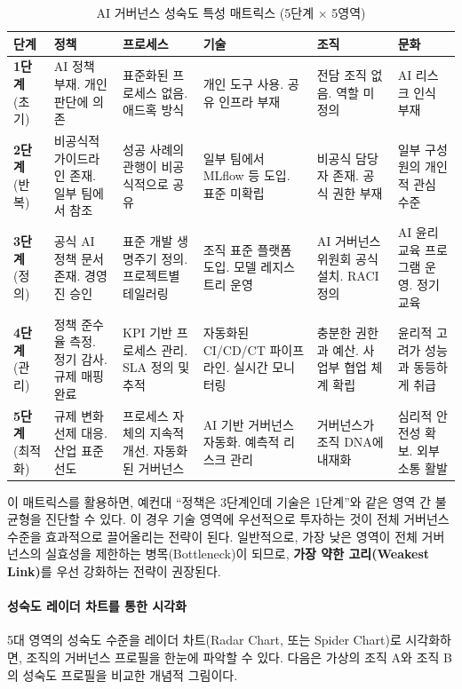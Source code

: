 \begin{table}[htbp]
\centering
\caption{AI 거버넌스 성숙도 특성 매트릭스 (5단계 $\times$ 5영역)}
\label{tab:maturity_matrix}
\footnotesize
\begin{tabularx}{\textwidth}{|l|X|X|X|X|X|}
\hline
\textbf{단계} & \textbf{정책} & \textbf{프로세스} & \textbf{기술} & \textbf{조직} & \textbf{문화} \\ \hline
\textbf{1단계} (초기) & AI 정책 부재. 개인 판단에 의존 & 표준화된 프로세스 없음. 애드혹 방식 & 개인 도구 사용. 공유 인프라 부재 & 전담 조직 없음. 역할 미정의 & AI 리스크 인식 부재 \\ \hline
\textbf{2단계} (반복) & 비공식적 가이드라인 존재. 일부 팀에서 참조 & 성공 사례의 관행이 비공식적으로 공유 & 일부 팀에서 MLflow 등 도입. 표준 미확립 & 비공식 담당자 존재. 공식 권한 부재 & 일부 구성원의 개인적 관심 수준 \\ \hline
\textbf{3단계} (정의) & 공식 AI 정책 문서 존재. 경영진 승인 & 표준 개발 생명주기 정의. 프로젝트별 테일러링 & 조직 표준 플랫폼 도입. 모델 레지스트리 운영 & AI 거버넌스 위원회 공식 설치. RACI 정의 & AI 윤리 교육 프로그램 운영. 정기 교육 \\ \hline
\textbf{4단계} (관리) & 정책 준수율 측정. 정기 감사. 규제 매핑 완료 & KPI 기반 프로세스 관리. SLA 정의 및 추적 & 자동화된 CI/CD/CT 파이프라인. 실시간 모니터링 & 충분한 권한과 예산. 사업부 협업 체계 확립 & 윤리적 고려가 성능과 동등하게 취급 \\ \hline
\textbf{5단계} (최적화) & 규제 변화 선제 대응. 산업 표준 선도 & 프로세스 자체의 지속적 개선. 자동화된 거버넌스 & AI 기반 거버넌스 자동화. 예측적 리스크 관리 & 거버넌스가 조직 DNA에 내재화 & 심리적 안전성 확보. 외부 소통 활발 \\ \hline
\end{tabularx}
\end{table}

이 매트릭스를 활용하면, 예컨대 ``정책은 3단계인데 기술은 1단계''와 같은 영역 간 불균형을 진단할 수 있다. 이 경우 기술 영역에 우선적으로 투자하는 것이 전체 거버넌스 수준을 효과적으로 끌어올리는 전략이 된다. 일반적으로, 가장 낮은 영역이 전체 거버넌스의 실효성을 제한하는 병목(Bottleneck)이 되므로, \textbf{가장 약한 고리(Weakest Link)}를 우선 강화하는 전략이 권장된다.

\paragraph{성숙도 레이더 차트를 통한 시각화}
5대 영역의 성숙도 수준을 레이더 차트(Radar Chart, 또는 Spider Chart)로 시각화하면, 조직의 거버넌스 프로필을 한눈에 파악할 수 있다. 다음은 가상의 조직 A와 조직 B의 성숙도 프로필을 비교한 개념적 그림이다.

